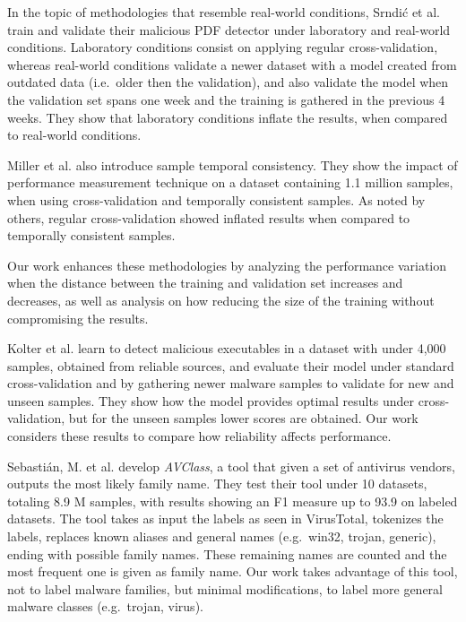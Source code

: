 In the topic of methodologies that resemble real-world conditions, Srndi\'c et al.\cite{vsrndic2013detection}
train and validate their malicious PDF detector under laboratory and real-world conditions. Laboratory conditions consist on applying regular cross-validation, whereas real-world conditions validate a newer dataset with a model created from outdated data (i.e.\ older then the validation), and also validate the model when the validation set spans one week and the training is gathered in the previous 4 weeks. They show that laboratory conditions inflate the results, when compared to real-world conditions.

Miller et al.\cite{miller:rev_int} also introduce sample temporal consistency. They show the impact of performance measurement technique on a dataset containing 1.1 million samples, when using cross-validation and temporally consistent samples. As noted by others, regular cross-validation showed inflated results when compared to temporally consistent samples.

Our work enhances these methodologies by analyzing the performance variation when the distance between the training and validation set increases and decreases, as well as analysis on how reducing the size of the training without compromising the results.

Kolter et al.\cite{kolter:learning} learn to detect malicious executables in a dataset with under 4,000 samples, obtained from reliable sources, and evaluate their model under standard cross-validation and by gathering newer malware samples to validate for new and unseen samples. They show how the model provides optimal results under cross-validation, but for the unseen samples lower scores are obtained. Our work considers these results to compare how reliability affects performance.

Sebastián, M. et al.\cite{sebastian2016avclass} develop \textit{AVClass}, a tool that given a set of antivirus vendors, outputs the most likely family name. They test their tool under 10 datasets, totaling 8.9 M samples, with results showing an F1 measure up to 93.9 on labeled datasets. The tool takes as input the labels as seen in VirusTotal, tokenizes the labels, replaces known aliases and general names (e.g.\ win32, trojan, generic), ending with possible family names. These remaining names are counted and the most frequent one is given as family name. Our work takes advantage of this tool, not to label malware families, but minimal modifications, to label more general malware classes (e.g.\ trojan, virus).

